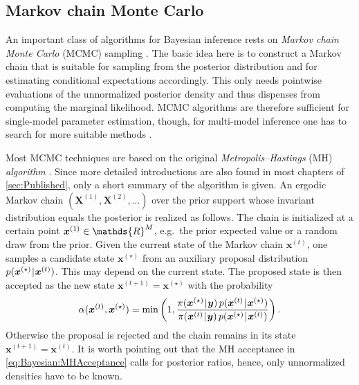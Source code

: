 \subsection{Markov chain Monte Carlo} \label{sec:Bayesian:BayesianComputations:MCMC}
An important class of algorithms for Bayesian inference rests on \emph{Markov chain Monte Carlo} (MCMC) sampling \cite{MCMC:Gamerman2006}.
The basic idea here is to construct a Markov chain that is suitable for sampling from the posterior distribution and for estimating conditional expectations accordingly.
This only needs pointwise evaluations of the unnormalized posterior density and thus dispenses from computing the marginal likelihood.
MCMC algorithms are therefore sufficient for single-model parameter estimation, though,
for multi-model inference one has to search for more suitable methods \cite{Bayesian:Friel2012,Bayesian:Schoniger2014,Bayesian:Knuth2015}.
\par %
Most MCMC techniques are based on the original \emph{Metropolis--Hastings} (MH) \emph{algorithm} \cite{MCMC:Metropolis1953,MCMC:Hastings1970}.
Since more detailed introductions are also found in most chapters of \cref{sec:Published}, only a short summary of the algorithm is given.
An ergodic Markov chain \((\bm{X}^{(1)},\bm{X}^{(2)},\ldots)\) over the prior support whose invariant distribution equals the posterior is realized as follows.
The chain is initialized at a certain point \(\bm{x}^{(1)} \in \mathds{R}^\dimParam\), e.g.\ the prior expected value or a random draw from the prior.
Given the current state of the Markov chain \(\bm{x}^{(t)}\), one samples a candidate state \(\bm{x}^{(\star)}\) from an auxiliary proposal distribution \(p(\bm{x}^{(\star)} {\:\!}|{\:\!} \bm{x}^{(t)})\).
This may depend on the current state.
The proposed state is then accepted as the new state \(\bm{x}^{(t+1)} = \bm{x}^{(\star)}\) with the probability
\begin{equation} \label{eq:Bayesian:MHAcceptance}
  \alpha(\bm{x}^{(t)}, \bm{x}^{(\star)}) = \operatorname{min}
  \left( 1, \frac{\pi(\bm{x}^{(\star)} \cond \bm{y}) \, p(\bm{x}^{(t)} \cond \bm{x}^{(\star)})}
  {\pi(\bm{x}^{(t)} \cond \bm{y}) \, p(\bm{x}^{(\star)} \cond \bm{x}^{(t)})} \right).
\end{equation}
Otherwise the proposal is rejected and the chain remains in its state \(\bm{x}^{(t+1)} = \bm{x}^{(t)}\).
It is worth pointing out that the MH acceptance in \cref{eq:Bayesian:MHAcceptance} calls for posterior ratios, hence, only unnormalized densities have to be known.
